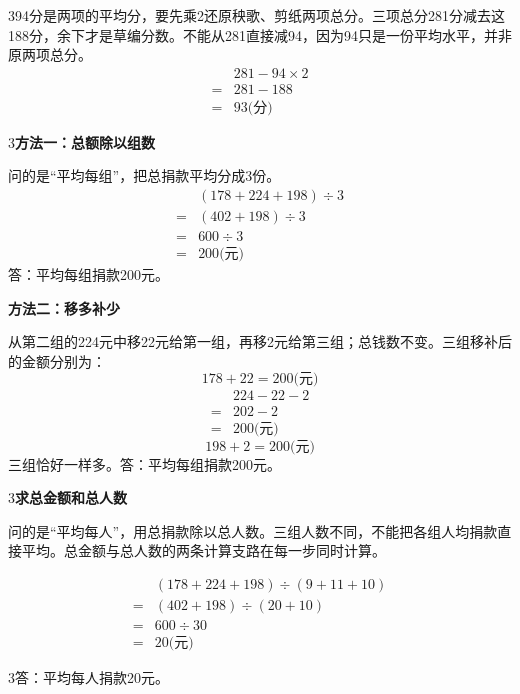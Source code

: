 \documentclass[multi=snippet,border={5bp 20bp 5bp 5bp}]{standalone}
\newenvironment{snippet}[3]{\begin{minipage}{#1bp}\color{answerred}\fontsize{#2}{#3}\selectfont\raggedright}{\end{minipage}}
\begin{document}
\begin{snippet}{200}{10.5}{12.8}\SourceSans\setlength{\mathindent}{2bp}{\color{black}}\end{snippet}
\begin{snippet}{505}{11.5}{14}\begin{multicols}{3}\raggedcolumns 94分是两项的平均分，要先乘2还原秧歌、剪纸两项总分。三项总分281分减去这188分，余下才是草编分数。不能从281直接减94，因为94只是一份平均水平，并非原两项总分。\[\begin{aligned}&281-94\times2\\={}&281-188\\={}&93\text{(分)}\end{aligned}\]\end{multicols}\end{snippet}
\begin{snippet}{80}{12}{12.8}\SourceSans{}\end{snippet}
\begin{snippet}{505}{11.5}{14}\begin{multicols}{3}\raggedcolumns \textbf{方法一：总额除以组数}\par 问的是“平均每组”，把总捐款平均分成3份。\[\begin{aligned}&(178+224+198)\div3\\={}&(402+198)\div3\\={}&600\div3\\={}&200\text{(元)}\end{aligned}\]答：平均每组捐款200元。\par \textbf{方法二：移多补少}\par 从第二组的224元中移22元给第一组，再移2元给第三组；总钱数不变。三组移补后的金额分别为：\[178+22=200\text{(元)}\]\[\begin{aligned}&224-22-2\\={}&202-2\\={}&200\text{(元)}\end{aligned}\]\[198+2=200\text{(元)}\]三组恰好一样多。答：平均每组捐款200元。\end{multicols}\end{snippet}
\begin{snippet}{505}{11.5}{14}\begin{multicols}{3}\raggedcolumns \textbf{求总金额和总人数}\par 问的是“平均每人”，用总捐款除以总人数。三组人数不同，不能把各组人均捐款直接平均。总金额与总人数的两条计算支路在每一步同时计算。\end{multicols}\[\begin{aligned}&(178+224+198)\div(9+11+10)\\={}&(402+198)\div(20+10)\\={}&600\div30\\={}&20\text{(元)}\end{aligned}\]\begin{multicols}{3}\raggedcolumns 答：平均每人捐款20元。\end{multicols}\end{snippet}
\end{document}
